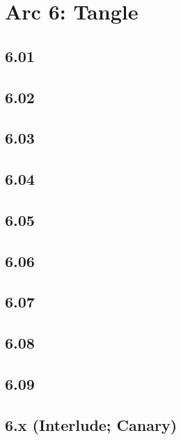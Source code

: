 \part{Arc 6: Tangle}
 \chapter{6.01}
 \chapter{6.02}
 \chapter{6.03}
 \chapter{6.04}
 \chapter{6.05}
 \chapter{6.06}
 \chapter{6.07}
 \chapter{6.08}
 \chapter{6.09}
 \chapter{6.x (Interlude; Canary)}











